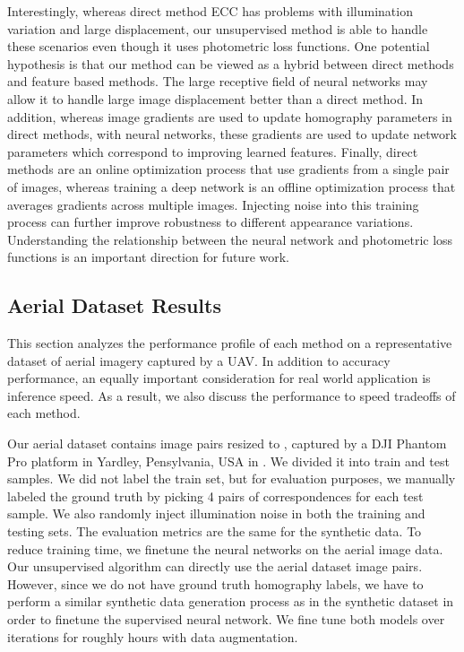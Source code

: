 \documentclass[letterpaper, 10 pt, conference]{ieeeconf}
\begin{document}
Interestingly, whereas direct method ECC has problems with illumination variation and large displacement, our unsupervised method is able to handle these scenarios even though it uses photometric loss functions. One potential hypothesis is that our method can be viewed as a hybrid between direct methods and feature based methods. The large receptive field of neural networks may allow it to handle large image displacement better than a direct method. In addition, whereas image gradients are used to update homography parameters in direct methods, with neural networks, these gradients are used to update network parameters which correspond to improving learned features. Finally, direct methods are an online optimization process that use gradients from a single pair of images, whereas training a deep network is an offline optimization process that averages gradients across multiple images. Injecting noise into this training process can further improve robustness to different appearance variations. Understanding the relationship between the neural network and photometric loss functions is an important direction for future work.

\subsection{Aerial Dataset Results}
This section analyzes the performance profile of each method on a representative dataset of aerial imagery captured by a UAV. In addition to accuracy performance, an equally important consideration for real world application is inference speed. As a result, we also discuss the performance to speed tradeoffs of each method.

Our aerial dataset contains  image pairs resized to , captured by a DJI Phantom  Pro platform in Yardley, Pensylvania, USA in . We divided it into  train and  test samples. We did not label the train set, but for evaluation purposes, we manually labeled the ground truth by picking 4 pairs of correspondences for each test sample. We also randomly inject illumination noise in both the training and testing sets. The evaluation metrics are the same for the synthetic data. To reduce training time, we finetune the neural networks on the aerial image data. Our unsupervised algorithm can directly use the aerial dataset image pairs. However, since we do not have ground truth homography labels, we have to perform a similar synthetic data generation process as in the synthetic dataset in order to finetune the supervised neural network. We fine tune both models over  iterations for roughly  hours with data augmentation.
\end{document}
